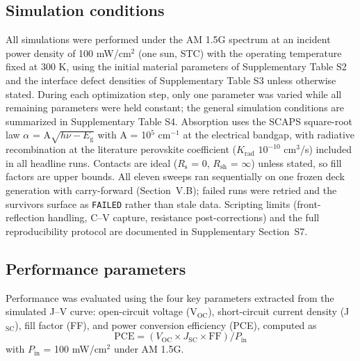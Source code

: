 \documentclass[review]{elsarticle}
\begin{document}
\subsection{Simulation conditions}
All simulations were performed under the AM 1.5G spectrum at an incident power density of 100 mW/cm$^{2}$ (one sun, STC) with the operating temperature fixed at 300 K, using the initial material parameters of Supplementary Table S2 and the interface defect densities of Supplementary Table S3 unless otherwise stated. During each optimization step, only one parameter was varied while all remaining parameters were held constant; the general simulation conditions are summarized in Supplementary Table S4. Absorption uses the SCAPS square-root law $\alpha$ = A$\sqrt{h\nu-E_{\mathrm{g}}}$ with A = 10$^{5}$ cm$^{-1}$ at the electrical bandgap, with radiative recombination at the literature perovskite coefficient ($K_{\mathrm{rad}}$ $10^{-10}$ cm$^{3}$/s) included in all headline runs. Contacts are ideal ($R_{\mathrm{s}}$ = 0, $R_{\mathrm{sh}}$ = $\infty$) unless stated, so fill factors are upper bounds. All eleven sweeps ran sequentially on one frozen deck generation with carry-forward (Section~V.B); failed runs were retried and the survivors surface as \texttt{FAILED} rather than stale data. Scripting limits (front-reflection handling, C--V capture, resistance post-corrections) and the full reproducibility protocol are documented in Supplementary Section~S7.



\subsection{Performance parameters}
Performance was evaluated using the four key parameters extracted from the simulated J--V curve: open-circuit voltage (V$_{\mathrm{OC}}$), short-circuit current density (J$_{\mathrm{SC}}$), fill factor (FF), and power conversion efficiency (PCE), computed as
\begin{equation}\label{eq:pce}
\mathrm{PCE} = (V_{\mathrm{OC}} \times J_{\mathrm{SC}} \times \mathrm{FF})/P_{\mathrm{in}}
\end{equation}
with $P_{\mathrm{in}}$ = 100 mW/cm$^{2}$ under AM 1.5G.
\end{document}
